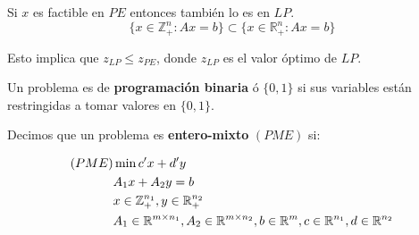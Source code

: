 \documentclass[PM.tex]{subfiles}
\begin{document}
\begin{obser}
Si $x$ es factible en $PE$ entonces también lo es en $LP$.
\[ \{x \in \mathbb{Z}_+^n : Ax=b \} \subset \{x \in \mathbb{R}_+^n : Ax=b \} \]

Esto implica que $z_{LP} ≤ z_{PE}$, donde $z_{LP} $ es el valor óptimo de $LP$.
\end{obser}
\begin{defi}
Un problema es de \textbf{programación binaria} ó $\{0,1\}$ si sus variables están restringidas a tomar valores en $\{0,1\}$.
\end{defi}
\newpage
\begin{defi}
Decimos que un problema es \textbf{entero-mixto} $(PME)$ si:

\begin{align*}
(PME) & \min c'x+d'y\\
	  & A_1 x + A_2 y = b\\
	  & x \in \mathbb{Z}_+^{n_1}, y \in \mathbb{R}_+^{n_2}\\
	  & A_1 \in \mathbb{R}^{m\times n_1}, A_2 \in \mathbb{R}^{m \times n_2}, b \in \mathbb{R}^m, c \in \mathbb{R}^{n_1}, d \in \mathbb{R}^{n_2}
\end{align*}
\end{defi}
\end{document}
